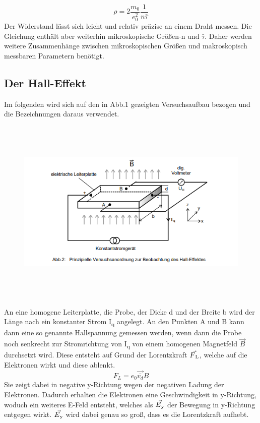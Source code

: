 \documentclass[titlepage=firstcover, captions=tableheading]{scrartcl}
\begin{document}
\begin{equation}
    \rho=2\frac{m_0}{e_0^2}\frac{1}{n\bar{\tau}}
\end{equation}
Der Widerstand lässt sich leicht und relativ präzise an einem Draht messen. Die Gleichung enthält aber weiterhin mikroskopische Größen-n und $\bar{\tau}$. Daher werden weitere Zusammenhänge zwischen mikroskopischen Größen und makroskopisch messbaren Parametern benötigt.

\subsection{Der Hall-Effekt}
Im folgenden wird sich auf den in Abb.1 gezeigten Versuchsaufbau bezogen und die Bezeichnungen daraus verwendet. \\
\begin{figure}[H]
    \centering
    \includegraphics[height=9cm]{Versuchsanordnung_HallEffekt.png}
\end{figure}
An eine homogene Leiterplatte, die Probe, der Dicke d und der Breite b wird der Länge nach ein konstanter Strom I\textsubscript{q} angelegt. An den Punkten A und B kann dann eine so genannte Hallspannung gemessen werden, wenn dann die Probe noch senkrecht zur Stromrichtung von I\textsubscript{q} von einem homogenen Magnetfeld $\vec{B}$ durchsetzt wird. Diese entsteht auf Grund der Lorentzkraft $\vec{F\textsubscript{L}}$, welche auf die Elektronen wirkt und diese ablenkt.
\begin{equation}
    F_L=e_0\vec{\bar{v_d}}B
\end{equation}
Sie zeigt dabei in negative y-Richtung wegen der negativen Ladung der Elektronen. Dadurch erhalten die Elektronen eine Geschwindigkeit in y-Richtung, woduch ein weiteres E-Feld entsteht, welches als $\vec{E\textsubscript{y}}$ der Bewegung in y-Richtung entgegen wirkt. $\vec{E\textsubscript{y}}$ wird dabei genau so groß, dass es die Lorentzkraft aufhebt.
\end{document}
